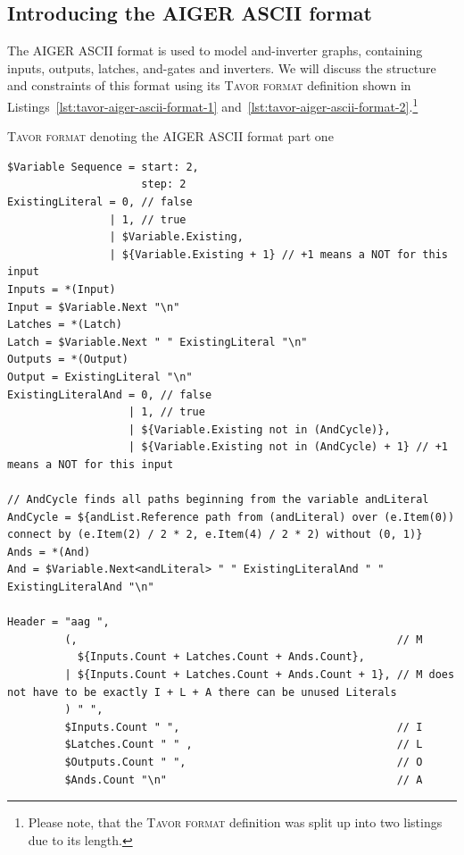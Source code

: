 \subsection{Introducing the AIGER ASCII format}
\label{subsec:evaluationIntroducingAigerAsciiFormat}

The AIGER ASCII format is used to model and-inverter graphs, containing inputs, outputs, latches, and-gates and inverters. We will discuss the structure and constraints of this format using its \textsc{Tavor format} definition shown in Listings~\ref{lst:tavor-aiger-ascii-format-1} and~\ref{lst:tavor-aiger-ascii-format-2}.\footnote{Please note, that the \textsc{Tavor format} definition was split up into two listings due to its length.}

\begin{listing}[H]
\caption{\textsc{Tavor format} denoting the AIGER ASCII format part one}
\label{lst:tavor-aiger-ascii-format-1}
\begin{verbatim}
$Variable Sequence = start: 2,
                     step: 2
ExistingLiteral = 0, // false
                | 1, // true
                | $Variable.Existing,
                | ${Variable.Existing + 1} // +1 means a NOT for this input
Inputs = *(Input)
Input = $Variable.Next "\n"
Latches = *(Latch)
Latch = $Variable.Next " " ExistingLiteral "\n"
Outputs = *(Output)
Output = ExistingLiteral "\n"
ExistingLiteralAnd = 0, // false
                   | 1, // true
                   | ${Variable.Existing not in (AndCycle)},
                   | ${Variable.Existing not in (AndCycle) + 1} // +1 means a NOT for this input

// AndCycle finds all paths beginning from the variable andLiteral
AndCycle = ${andList.Reference path from (andLiteral) over (e.Item(0)) connect by (e.Item(2) / 2 * 2, e.Item(4) / 2 * 2) without (0, 1)}
Ands = *(And)
And = $Variable.Next<andLiteral> " " ExistingLiteralAnd " " ExistingLiteralAnd "\n"

Header = "aag ",
         (,                                                  // M
           ${Inputs.Count + Latches.Count + Ands.Count},
         | ${Inputs.Count + Latches.Count + Ands.Count + 1}, // M does not have to be exactly I + L + A there can be unused Literals
         ) " ",
         $Inputs.Count " ",                                  // I
         $Latches.Count " " ,                                // L
         $Outputs.Count " ",                                 // O
         $Ands.Count "\n"                                    // A
\end{verbatim}
\end{listing}

